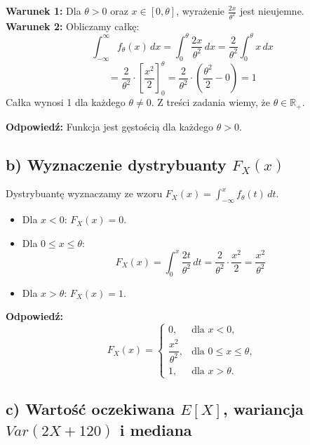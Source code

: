\documentclass[polish, 10pt]{extarticle}
\begin{document}
\noindent \textbf{Warunek 1:} Dla $\theta > 0$ oraz $x \in [0, \theta]$, wyrażenie $\frac{2x}{\theta^2}$ jest nieujemne. \\
\textbf{Warunek 2:} Obliczamy całkę:
\[
\int_{-\infty}^{\infty} f_\theta(x) \, dx = \int_0^\theta \frac{2x}{\theta^2} \, dx = \frac{2}{\theta^2} \int_0^\theta x \, dx
\]
\[
= \frac{2}{\theta^2} \cdot \left[ \frac{x^2}{2} \right]_0^\theta = \frac{2}{\theta^2} \cdot \left( \frac{\theta^2}{2} - 0 \right) = 1
\]
Całka wynosi 1 dla każdego $\theta \neq 0$. Z treści zadania wiemy, że $\theta \in \mathbb{R}_+$.

\noindent \textbf{Odpowiedź:} Funkcja jest gęstością dla każdego $\theta > 0$.

\subsection*{b) Wyznaczenie dystrybuanty $F_X(x)$}
Dystrybuantę wyznaczamy ze wzoru $F_X(x) = \int_{-\infty}^x f_\theta(t) \, dt$.

\begin{itemize}
    \item Dla $x < 0$: $F_X(x) = 0$.
    \item Dla $0 \leq x \leq \theta$:
    \[
    F_X(x) = \int_0^x \frac{2t}{\theta^2} \, dt = \frac{2}{\theta^2} \cdot \frac{x^2}{2} = \frac{x^2}{\theta^2}
    \]
    \item Dla $x > \theta$: $F_X(x) = 1$.
\end{itemize}

\noindent \textbf{Odpowiedź:}
\[
F_X(x) =
\begin{cases}
0, & \text{dla } x < 0, \\[6pt]
\dfrac{x^2}{\theta^2}, & \text{dla } 0 \leq x \leq \theta, \\[6pt]
1, & \text{dla } x > \theta.
\end{cases}
\]

\subsection*{c) Wartość oczekiwana $E[X]$, wariancja $Var(2X+120)$ i mediana}
\end{document}
